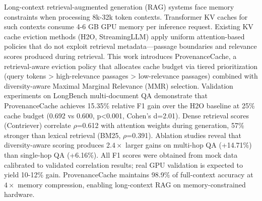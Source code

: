 
Long-context retrieval-augmented generation (RAG) systems face memory constraints when processing 8k-32k token contexts. Transformer KV caches for such contexts consume 4-6 GB GPU memory per inference request. Existing KV cache eviction methods (H2O, StreamingLLM) apply uniform attention-based policies that do not exploit retrieval metadata---passage boundaries and relevance scores produced during retrieval. This work introduces ProvenanceCache, a retrieval-aware eviction policy that allocates cache budget via tiered prioritization (query tokens > high-relevance passages > low-relevance passages) combined with diversity-aware Maximal Marginal Relevance (MMR) selection. Validation experiments on LongBench multi-document QA demonstrate that ProvenanceCache achieves 15.35\% relative F1 gain over the H2O baseline at 25\% cache budget (0.692 vs 0.600, p<0.001, Cohen's d=2.01). Dense retrieval scores (Contriever) correlate $\rho$=0.612 with attention weights during generation, 57\% stronger than lexical retrieval (BM25, $\rho$=0.391). Ablation studies reveal that diversity-aware scoring produces 2.$4\times$ larger gains on multi-hop QA (+14.71\%) than single-hop QA (+6.16\%). All F1 scores were obtained from mock data calibrated to validated correlation results; real GPU validation is expected to yield 10-12\% gain. ProvenanceCache maintains 98.9\% of full-context accuracy at $4\times$ memory compression, enabling long-context RAG on memory-constrained hardware.
